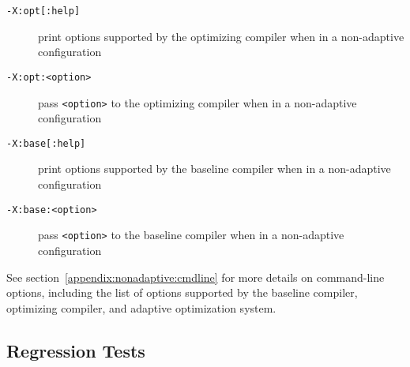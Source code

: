 \begin{description}
\item[{\tt -X:opt[:help]}]
print options supported by the optimizing compiler when in a 
non-adaptive configuration

\item[{\tt -X:opt:<option>}]
pass {\tt <option>} to the optimizing compiler when in a non-adaptive configuration

\item[{\tt -X:base[:help]}]
print options supported by the baseline compiler when in a 
non-adaptive configuration

\item[{\tt -X:base:<option>}]
pass {\tt <option>} to the baseline compiler when in a non-adaptive configuration

\end{description}

See section~\ref{appendix:nonadaptive:cmdline} for more details on 
command-line options, including the list of options supported by the 
baseline compiler, optimizing compiler, and adaptive optimization system.

\JikesTMFooter

\JavaTMFooter

\subsection{Regression Tests}

